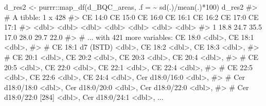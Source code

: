\documentclass[
  letterpaper,
  DIV=11,
  numbers=noendperiod]{scrreprt}
\newenvironment{Shaded}{\begin{snugshade}}{\end{snugshade}}
\newcommand{\AttributeTok}[1]{\textcolor[rgb]{0.40,0.45,0.13}{#1}}
\newcommand{\CommentTok}[1]{\textcolor[rgb]{0.37,0.37,0.37}{#1}}
\newcommand{\DecValTok}[1]{\textcolor[rgb]{0.68,0.00,0.00}{#1}}
\newcommand{\FunctionTok}[1]{\textcolor[rgb]{0.28,0.35,0.67}{#1}}
\newcommand{\NormalTok}[1]{\textcolor[rgb]{0.00,0.23,0.31}{#1}}
\newcommand{\OtherTok}[1]{\textcolor[rgb]{0.00,0.23,0.31}{#1}}
\newcommand{\SpecialCharTok}[1]{\textcolor[rgb]{0.37,0.37,0.37}{#1}}
\begin{document}
\begin{Shaded}
\begin{Highlighting}[]
\NormalTok{d\_res2 }\OtherTok{\textless{}{-}}\NormalTok{ purrr}\SpecialCharTok{::}\FunctionTok{map\_df}\NormalTok{(d\_BQC\_areas, }\AttributeTok{.f =} \SpecialCharTok{\textasciitilde{}} \FunctionTok{sd}\NormalTok{(.)}\SpecialCharTok{/}\FunctionTok{mean}\NormalTok{(.)}\SpecialCharTok{*}\DecValTok{100}\NormalTok{)}
\NormalTok{d\_res2}
\CommentTok{\#\textgreater{} \# A tibble: 1 x 428}
\CommentTok{\#\textgreater{}   \textasciigrave{}CE 14:0\textasciigrave{} \textasciigrave{}CE 15:0\textasciigrave{} \textasciigrave{}CE 16:0\textasciigrave{} \textasciigrave{}CE 16:1\textasciigrave{} \textasciigrave{}CE 16:2\textasciigrave{} \textasciigrave{}CE 17:0\textasciigrave{} \textasciigrave{}CE 17:1\textasciigrave{}}
\CommentTok{\#\textgreater{}       \textless{}dbl\textgreater{}     \textless{}dbl\textgreater{}     \textless{}dbl\textgreater{}     \textless{}dbl\textgreater{}     \textless{}dbl\textgreater{}     \textless{}dbl\textgreater{}     \textless{}dbl\textgreater{}}
\CommentTok{\#\textgreater{} 1      18.8      24.7      35.5      17.0      28.0      29.7      22.0}
\CommentTok{\#\textgreater{} \# ... with 421 more variables: \textasciigrave{}CE 18:0\textasciigrave{} \textless{}dbl\textgreater{}, \textasciigrave{}CE 18:1\textasciigrave{} \textless{}dbl\textgreater{},}
\CommentTok{\#\textgreater{} \#   \textasciigrave{}CE 18:1 d7 (ISTD)\textasciigrave{} \textless{}dbl\textgreater{}, \textasciigrave{}CE 18:2\textasciigrave{} \textless{}dbl\textgreater{}, \textasciigrave{}CE 18:3\textasciigrave{} \textless{}dbl\textgreater{},}
\CommentTok{\#\textgreater{} \#   \textasciigrave{}CE 20:1\textasciigrave{} \textless{}dbl\textgreater{}, \textasciigrave{}CE 20:2\textasciigrave{} \textless{}dbl\textgreater{}, \textasciigrave{}CE 20:3\textasciigrave{} \textless{}dbl\textgreater{}, \textasciigrave{}CE 20:4\textasciigrave{} \textless{}dbl\textgreater{},}
\CommentTok{\#\textgreater{} \#   \textasciigrave{}CE 20:5\textasciigrave{} \textless{}dbl\textgreater{}, \textasciigrave{}CE 22:0\textasciigrave{} \textless{}dbl\textgreater{}, \textasciigrave{}CE 22:1\textasciigrave{} \textless{}dbl\textgreater{}, \textasciigrave{}CE 22:4\textasciigrave{} \textless{}dbl\textgreater{},}
\CommentTok{\#\textgreater{} \#   \textasciigrave{}CE 22:5\textasciigrave{} \textless{}dbl\textgreater{}, \textasciigrave{}CE 22:6\textasciigrave{} \textless{}dbl\textgreater{}, \textasciigrave{}CE 24:4\textasciigrave{} \textless{}dbl\textgreater{}, \textasciigrave{}Cer d18:0/16:0\textasciigrave{} \textless{}dbl\textgreater{},}
\CommentTok{\#\textgreater{} \#   \textasciigrave{}Cer d18:0/18:0\textasciigrave{} \textless{}dbl\textgreater{}, \textasciigrave{}Cer d18:0/20:0\textasciigrave{} \textless{}dbl\textgreater{}, \textasciigrave{}Cer d18:0/22:0\textasciigrave{} \textless{}dbl\textgreater{},}
\CommentTok{\#\textgreater{} \#   \textasciigrave{}Cer d18:0/22:0 [284]\textasciigrave{} \textless{}dbl\textgreater{}, \textasciigrave{}Cer d18:0/24:1\textasciigrave{} \textless{}dbl\textgreater{}, ...}


\end{Highlighting}
\end{Shaded}
\end{document}
